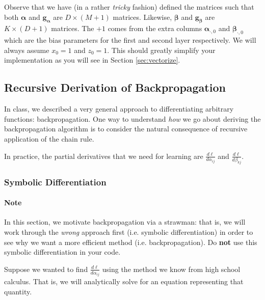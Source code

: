 \documentclass[11pt]{article}
\numberwithin{equation}{section} %
\numberwithin{figure}{section} %
\numberwithin{table}{section} %
\newcommand{\adj}[1]{\frac{d \ell}{d #1}}
\newcommand{\gv}{\mathbf{g}}
\newcommand{\alphav     }{\boldsymbol \alpha     }
\newcommand{\betav      }{\boldsymbol \beta      }
\begin{document}
Observe that we have (in a rather \emph{tricky} fashion) defined the matrices such that both $\alphav$ and $\gv_{\alphav}$ are $D \times (M+1)$ matrices. Likewise, $\betav$ and $\gv_{\betav}$ are $K \times (D+1)$ matrices. The $+1$ comes from the extra columns $\alphav_{\cdot, 0}$ and $\betav_{\cdot, 0}$ which are the bias parameters for the first and second layer respectively. We will always assume $x_0 = 1$ and $z_0 = 1$. This should greatly simplify your implementation as you will see in Section \ref{sec:vectorize}.


\subsection{Recursive Derivation of Backpropagation}
\label{sec:recursive}

In class, we described a very general approach to differentiating arbitrary functions: backpropagation. One way to understand \emph{how} we go about deriving the backpropagation algorithm is to consider the natural consequence of recursive application of the chain rule. 

In practice, the partial derivatives that we need for learning are $\adj{\alpha_{ij}}$ and $\adj{\beta_{kj}}$.

\subsubsection{Symbolic Differentiation}

\begin{notebox}
\paragraph{Note} In this section, we motivate backpropagation via a strawman: that is, we will work through the \emph{wrong} approach first (i.e. symbolic differentiation) in order to see why we want a more efficient method (i.e. backpropagation). Do {\bf not} use this symbolic differentiation in your code.
\end{notebox}

Suppose we wanted to find $\adj{\alpha_{ij}}$ using the method we know from high school calculus. That is, we will analytically solve for an equation representing that quantity.
\end{document}
